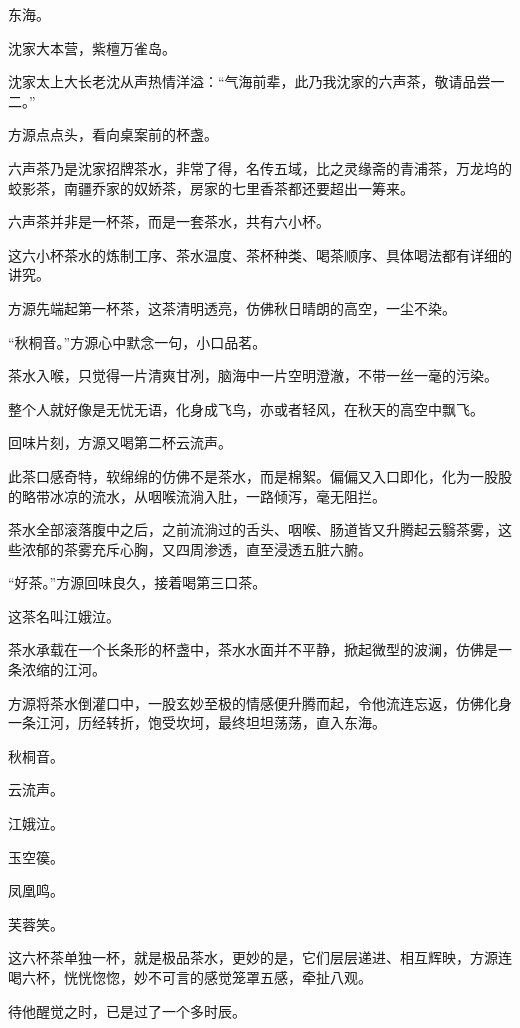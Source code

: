 
\begin{this_body}

东海。

沈家大本营，紫檀万雀岛。

沈家太上大长老沈从声热情洋溢：“气海前辈，此乃我沈家的六声茶，敬请品尝一二。”

方源点点头，看向桌案前的杯盏。

六声茶乃是沈家招牌茶水，非常了得，名传五域，比之灵缘斋的青浦茶，万龙坞的蛟影茶，南疆乔家的奴娇茶，房家的七里香茶都还要超出一筹来。

六声茶并非是一杯茶，而是一套茶水，共有六小杯。

这六小杯茶水的炼制工序、茶水温度、茶杯种类、喝茶顺序、具体喝法都有详细的讲究。

方源先端起第一杯茶，这茶清明透亮，仿佛秋日晴朗的高空，一尘不染。

“秋桐音。”方源心中默念一句，小口品茗。

茶水入喉，只觉得一片清爽甘冽，脑海中一片空明澄澈，不带一丝一毫的污染。

整个人就好像是无忧无语，化身成飞鸟，亦或者轻风，在秋天的高空中飘飞。

回味片刻，方源又喝第二杯云流声。

此茶口感奇特，软绵绵的仿佛不是茶水，而是棉絮。偏偏又入口即化，化为一股股的略带冰凉的流水，从咽喉流淌入肚，一路倾泻，毫无阻拦。

茶水全部滚落腹中之后，之前流淌过的舌头、咽喉、肠道皆又升腾起云翳茶雾，这些浓郁的茶雾充斥心胸，又四周渗透，直至浸透五脏六腑。

“好茶。”方源回味良久，接着喝第三口茶。

这茶名叫江娥泣。

茶水承载在一个长条形的杯盏中，茶水水面并不平静，掀起微型的波澜，仿佛是一条浓缩的江河。

方源将茶水倒灌口中，一股玄妙至极的情感便升腾而起，令他流连忘返，仿佛化身一条江河，历经转折，饱受坎坷，最终坦坦荡荡，直入东海。

秋桐音。

云流声。

江娥泣。

玉空篌。

凤凰鸣。

芙蓉笑。

这六杯茶单独一杯，就是极品茶水，更妙的是，它们层层递进、相互辉映，方源连喝六杯，恍恍惚惚，妙不可言的感觉笼罩五感，牵扯八观。

待他醒觉之时，已是过了一个多时辰。


\end{this_body}
